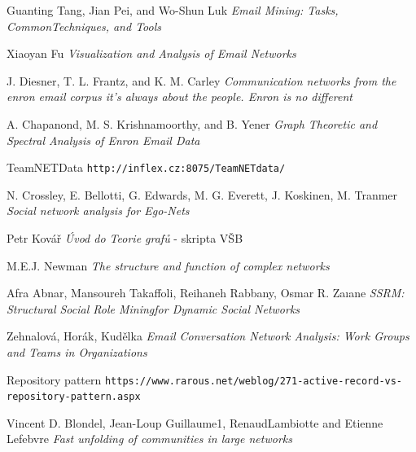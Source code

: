 \documentclass[slovak,master,public,dept460,male,cpdeclaration,oneside]{diploma}
\begin{document}
\newpage
\begin{thebibliography}{99}

	 Guanting Tang, Jian Pei, and Wo-Shun Luk
		\newline
		\textit{Email Mining: Tasks, CommonTechniques, and Tools}
	 
	 Xiaoyan Fu 
		\newline
		\textit{Visualization and Analysis of Email Networks}
	
	 J. Diesner, T. L. Frantz, and K. M. Carley
		\newline
		\textit{Communication networks
from the enron email corpus it’s always about the people. Enron is no different}

	 A. Chapanond, M. S. Krishnamoorthy, and B. Yener 
		\newline
	 	\textit{Graph Theoretic and Spectral Analysis of Enron Email Data }
	
	 TeamNETData
		\newline
		\texttt{http://inflex.cz:8075/TeamNETdata/}
	
	 N. Crossley, E. Bellotti, G. Edwards, M. G. Everett, J. Koskinen, M. Tranmer 
		\newline
	 	\textit{Social network analysis for Ego-Nets}	
	
	 Petr Kovář
		\newline
		\textit{Úvod do Teorie grafů} - skripta VŠB 
	
	 M.E.J. Newman
		\newline
		\textit{The structure and function of complex networks}
	
	 Afra Abnar, Mansoureh Takaffoli, Reihaneh Rabbany, Osmar R. Zaıane 
		\newline
		\textit{SSRM: Structural Social Role Miningfor Dynamic Social Networks}
	
	 Zehnalová, Horák, Kudělka
		\newline
		\textit{Email Conversation Network Analysis: Work Groups and Teams in Organizations}
	
	 Repository pattern 
		\newline
		\texttt{https://www.rarous.net/weblog/271-active-record-vs-repository-pattern.aspx}
	
	 Vincent D. Blondel, Jean-Loup Guillaume1, RenaudLambiotte and Etienne Lefebvre
		\newline
		\textit{Fast unfolding of communities in large networks}
	

\end{thebibliography}
\end{document}
